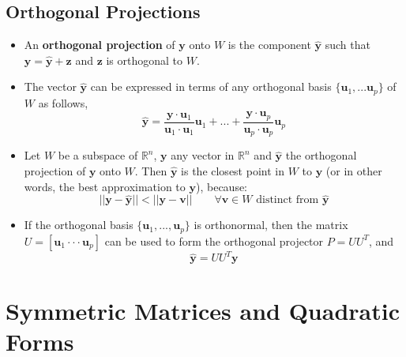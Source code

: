 \documentclass[a4paper,12pt]{article}
\begin{document}
\subsection{Orthogonal Projections}
\begin{itemize}
\item An \textbf{orthogonal projection} of $\mathbf{y}$ onto $W$ is the component $\mathbf{\hat{y}}$ such that $\mathbf{y} = \mathbf{\hat{y}}+\mathbf{z}$ and $\mathbf{z}$ is orthogonal to $W$.
\item The vector $\mathbf{\hat{y}}$ can be expressed in terms of any orthogonal basis $\{\mathbf{u}_1,...\mathbf{u}_p\}$ of $W$ as follows,
$$\mathbf{\hat{y}} = \frac{\mathbf{y} \cdot \mathbf{u}_1}{\mathbf{u}_1 \cdot \mathbf{u}_1} \mathbf{u}_1 + ... + \frac{\mathbf{y} \cdot \mathbf{u}_p}{\mathbf{u}_p \cdot \mathbf{u}_p} \mathbf{u}_p$$
\item Let $W$ be a subspace of $\mathbb{R}^n$, $\mathbf{y}$ any vector in $\mathbb{R}^n$ and $\mathbf{\hat{y}}$ the orthogonal projection of $\mathbf{y}$ onto $W$. Then $\mathbf{\hat{y}}$ is the closest point in $W$ to $\mathbf{y}$ (or in other words, the best approximation to $\mathbf{y}$), because:
$$||\mathbf{y}-\mathbf{\hat{y}}|| < ||\mathbf{y}-\mathbf{v}||\qquad \forall \mathbf{v} \in W \text{ distinct from }\mathbf{\hat{y}}$$
\item If the orthogonal basis $\{\mathbf{u}_1,...,\mathbf{u}_p\}$ is orthonormal, then the matrix $U=[\mathbf{u}_1 \cdot\cdot\cdot \mathbf{u}_p]$ can be used to form the orthogonal projector $P=UU^T$, and
$$\mathbf{\hat{y}}=UU^T\mathbf{y}$$
\end{itemize}  
\section{Symmetric Matrices and Quadratic Forms}

\end{document}
